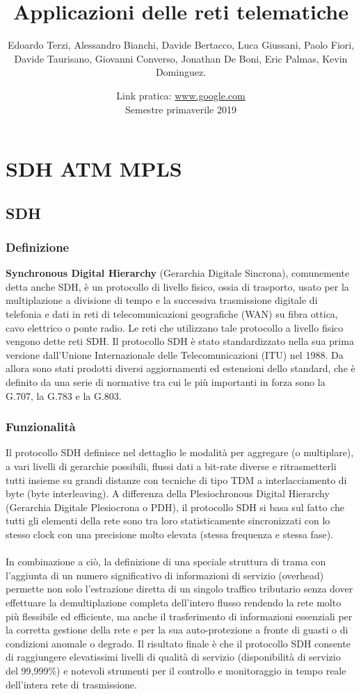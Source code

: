 \documentclass[8pt]{extarticle}
\title{\Huge Applicazioni delle reti telematiche \vspace{1cm}}
\author{Edoardo Terzi, Alessandro Bianchi, Davide Bertacco, Luca Giussani, Paolo Fiori, \\
Davide Taurisano, Giovanni Converso, Jonathan De Boni, Eric Palmas, Kevin Dominguez.\vspace{0.5cm}}
\date{Link pratica: \url{www.google.com} \\ Semestre primaverile 2019}
\begin{document}
\maketitle
\thispagestyle{empty}
\pagebreak

\tableofcontents
\lstset{language=C++}
\pagebreak

\section{SDH ATM MPLS}
\subsection{SDH}
\subsubsection{Definizione}
\noindent
\textbf{Synchronous Digital Hierarchy} (Gerarchia Digitale Sincrona), comunemente detta anche SDH, è un 
protocollo di livello fisico, ossia di trasporto, usato per la multiplazione a divisione di tempo e la 
successiva trasmissione digitale di telefonia e dati in reti di telecomunicazioni geografiche (WAN) su 
fibra ottica, cavo elettrico o ponte radio. Le reti che utilizzano tale protocollo a livello fisico 
vengono dette reti SDH. Il protocollo SDH è stato standardizzato nella sua prima versione dall'Unione 
Internazionale delle Telecomunicazioni (ITU) nel 1988. Da allora sono stati prodotti diversi aggiornamenti 
ed estensioni dello standard, che è definito da una serie di normative tra cui le più importanti in forza 
sono la G.707, la G.783 e la G.803.
\subsubsection{Funzionalità}
\noindent
Il protocollo SDH definisce nel dettaglio le modalità per aggregare (o multiplare), a vari livelli di 
gerarchie possibili, flussi dati a bit-rate diverse e ritrasmetterli tutti insieme su grandi distanze 
con tecniche di tipo TDM a interlacciamento di byte (byte interleaving). A differenza della Plesiochronous 
Digital Hierarchy (Gerarchia Digitale Plesiocrona o PDH), il protocollo SDH si basa sul fatto che tutti 
gli elementi della rete sono tra loro statisticamente sincronizzati con lo stesso clock con una precisione 
molto elevata (stessa frequenza e stessa fase).\\\\
In combinazione a ciò, la definizione di una speciale struttura di trama con l'aggiunta di un numero 
significativo di informazioni di servizio (overhead) permette non solo l'estrazione diretta di un singolo 
traffico tributario senza dover effettuare la demultiplazione completa dell'intero flusso rendendo la 
rete molto più flessibile ed efficiente, ma anche il trasferimento di informazioni essenziali per la 
corretta gestione della rete e per la sua auto-protezione a fronte di guasti o di condizioni anomale o 
degrado. Il risultato finale è che il protocollo SDH consente di raggiungere elevatissimi livelli di 
qualità di servizio (disponibilità di servizio del 99,999\%) e notevoli strumenti per il controllo e 
monitoraggio in tempo reale dell'intera rete di trasmissione.
\end{document}
